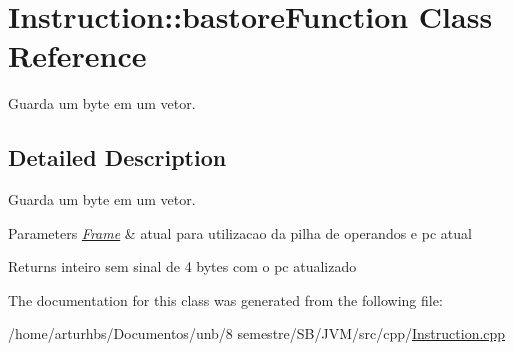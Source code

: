 \hypertarget{classInstruction_1_1bastoreFunction}{}\section{Instruction\+:\+:bastore\+Function Class Reference}
\label{classInstruction_1_1bastoreFunction}


Guarda um byte em um vetor.  




\subsection{Detailed Description}
Guarda um byte em um vetor. 


\begin{DoxyParams}{Parameters}
{\em \hyperlink{classFrame}{Frame}} & atual para utilizacao da pilha de operandos e pc atual \\
\hline
\end{DoxyParams}
\begin{DoxyReturn}{Returns}
inteiro sem sinal de 4 bytes com o pc atualizado 
\end{DoxyReturn}


The documentation for this class was generated from the following file\+:\begin{DoxyCompactItemize}
\item 
/home/arturhbs/\+Documentos/unb/8 semestre/\+S\+B/\+J\+V\+M/src/cpp/\hyperlink{Instruction_8cpp}{Instruction.\+cpp}\end{DoxyCompactItemize}
